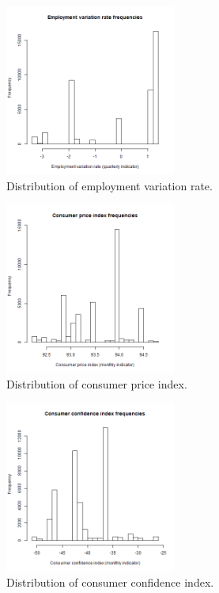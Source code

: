 \documentclass[11pt]{article}
\begin{document}
\begin{figure}[h]
	\centering
	\includegraphics[width=0.5\textwidth]{images/emp_var_rate}
	\caption{Distribution of employment variation rate.}
	\label{fig:emp_var_rate}
\end{figure}

\begin{figure}[h]
	\centering
	\includegraphics[width=0.5\textwidth]{images/consumer_price_index}
	\caption{Distribution of consumer price index.}
	\label{fig:cons_price_idx}
\end{figure}

\begin{figure}[h]
	\centering
	\includegraphics[width=0.5\textwidth]{images/consumer_confidence_index}
	\caption{Distribution of consumer confidence index.}
	\label{fig:cons_conf_idx}
\end{figure}
\end{document}
